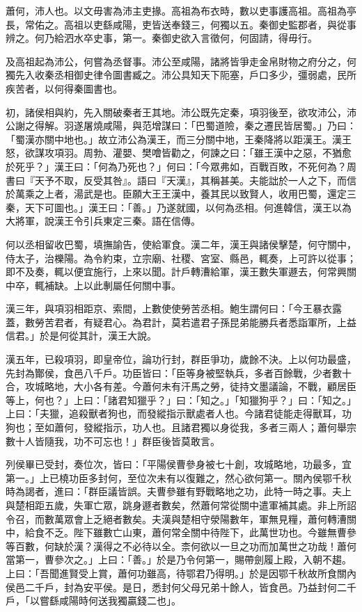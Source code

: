 
\begin{pinyinscope}
蕭何，沛人也。以文毋害為沛主吏掾。高祖為布衣時，數以吏事護高祖。高祖為亭長，常佑之。高祖以吏繇咸陽，吏皆送奉錢三，何獨以五。秦御史監郡者，與從事辨之。何乃給泗水卒史事，第一。秦御史欲入言徵何，何固請，得毋行。

及高祖起為沛公，何嘗為丞督事。沛公至咸陽，諸將皆爭走金帛財物之府分之，何獨先入收秦丞相御史律令圖書臧之。沛公具知天下阨塞，戶口多少，彊弱處，民所疾苦者，以何得秦圖書也。

初，諸侯相與約，先入關破秦者王其地。沛公既先定秦，項羽後至，欲攻沛公，沛公謝之得解。羽遂屠燒咸陽，與范增謀曰：「巴蜀道險，秦之遷民皆居蜀。」乃曰：「蜀漢亦關中地也。」故立沛公為漢王，而三分關中地，王秦降將以距漢王。漢王怒，欲謀攻項羽。周勃、灌嬰、樊噲皆勸之，何諫之曰：「雖王漢中之惡，不猶愈於死乎？」漢王曰：「何為乃死也？」何曰：「今眾弗如，百戰百敗，不死何為？周書曰『天予不取，反受其咎』。語曰『天漢』，其稱甚美。夫能詘於一人之下，而信於萬乘之上者，湯武是也。臣願大王王漢中，養其民以致賢人，收用巴蜀，還定三秦，天下可圖也。」漢王曰：「善。」乃遂就國，以何為丞相。何進韓信，漢王以為大將軍，說漢王令引兵東定三秦。語在信傳。

何以丞相留收巴蜀，填撫諭告，使給軍食。漢二年，漢王與諸侯擊楚，何守關中，侍太子，治櫟陽。為令約束，立宗廟、社稷、宮室、縣邑，輒奏，上可許以從事；即不及奏，輒以便宜施行，上來以聞。計戶轉漕給軍，漢王數失軍遯去，何常興關中卒，輒補缺。上以此剸屬任何關中事。

漢三年，與項羽相距京、索間，上數使使勞苦丞相。鮑生謂何曰：「今王暴衣露蓋，數勞苦君者，有疑君心。為君計，莫若遣君子孫昆弟能勝兵者悉詣軍所，上益信君。」於是何從其計，漢王大說。

漢五年，已殺項羽，即皇帝位，論功行封，群臣爭功，歲餘不決。上以何功最盛，先封為酇侯，食邑八千戶。功臣皆曰：「臣等身被堅執兵，多者百餘戰，少者數十合，攻城略地，大小各有差。今蕭何未有汗馬之勞，徒持文墨議論，不戰，顧居臣等上，何也？」上曰：「諸君知獵乎？」曰：「知之。」「知獵狗乎？」曰：「知之。」上曰：「夫獵，追殺獸者狗也，而發縱指示獸處者人也。今諸君徒能走得獸耳，功狗也；至如蕭何，發縱指示，功人也。且諸君獨以身從我，多者三兩人；蕭何舉宗數十人皆隨我，功不可忘也！」群臣後皆莫敢言。

列侯畢已受封，奏位次，皆曰：「平陽侯曹參身被七十創，攻城略地，功最多，宜第一。」上已橈功臣多封何，至位次未有以復難之，然心欲何第一。關內侯鄂千秋時為謁者，進曰：「群臣議皆誤。夫曹參雖有野戰略地之功，此特一時之事。夫上與楚相距五歲，失軍亡眾，跳身遯者數矣，然蕭何常從關中遣軍補其處。非上所詔令召，而數萬眾會上乏絕者數矣。夫漢與楚相守滎陽數年，軍無見糧，蕭何轉漕關中，給食不乏。陛下雖數亡山東，蕭何常全關中待陛下，此萬世功也。今雖無曹參等百數，何缺於漢？漢得之不必待以全。柰何欲以一旦之功而加萬世之功哉！蕭何當第一，曹參次之。」上曰：「善。」於是乃令何第一，賜帶劍履上殿，入朝不趨。上曰：「吾聞進賢受上賞，蕭何功雖高，待鄂君乃得明。」於是因鄂千秋故所食關內侯邑二千戶，封為安平侯。是日，悉封何父母兄弟十餘人，皆食邑。乃益封何二千戶，「以嘗繇咸陽時何送我獨贏錢二也」。


\end{pinyinscope}
